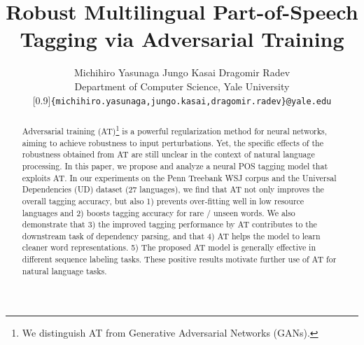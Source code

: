 \documentclass[11pt,a4paper]{article}
\title{Robust Multilingual 
Part-of-Speech Tagging 
via Adversarial Training}
\author{Michihiro Yasunaga \quad\quad\quad Jungo Kasai \quad\quad\quad Dragomir Radev\\
Department of Computer Science, Yale University\\
\scalebox{0.85}[0.9]{{\tt \{michihiro.yasunaga,jungo.kasai,dragomir.radev\}@yale.edu}}}
\date{}
\begin{document}
\setlength{\abovedisplayskip}{4pt}
\setlength{\belowdisplayskip}{4pt}
\setlength{\extrarowheight}{4pt} %



\maketitle


\begin{abstract}
Adversarial training (AT)\footnote{We distinguish AT from  Generative Adversarial Networks (GANs).} 
is a powerful regularization method for neural networks, aiming to achieve robustness to input perturbations.
Yet, the specific effects of the robustness obtained from AT are still unclear
in the context of natural language processing.
In this paper, we propose and analyze a neural POS tagging model that exploits AT.
In our experiments on the Penn Treebank WSJ corpus
and the Universal Dependencies (UD) dataset (27 languages),
we find that AT
not only improves the overall tagging accuracy, but also
1) prevents over-fitting well in low resource languages and
2) boosts tagging accuracy for rare \!/\! unseen words.
We also demonstrate that 3) the improved tagging performance by AT contributes to the downstream task of dependency parsing, and that 4)
AT helps the model to learn cleaner
word representations.
5) The proposed AT model is generally effective in different sequence labeling tasks.
These positive results motivate further use of AT for natural language tasks.
\end{abstract}
\end{document}
